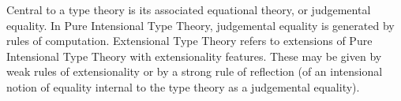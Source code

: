 \documentclass[11pt,twocolumn]{article}
\newcommand{\pref}[1]{\,(\ref{#1})}
\newcommand{\eg}{\emph{eg.}}
\begin{document}
Central to a type theory is its associated equational theory, %
or %
judgemental equality.
%
In Pure Intensional Type Theory, judgemental equality is generated by
rules of computation. 
%
Extensional Type Theory refers to extensions of Pure Intensional Type Theory
with extensionality features.  These may be given by weak rules of
extensionality or by a strong rule of reflection (of an intensional notion of
equality internal to the type theory as a judgemental equality).
\end{document}
